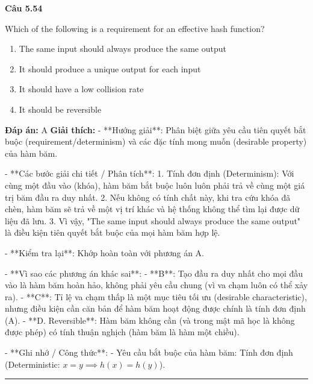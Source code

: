 \documentclass[11pt,a4paper]{article}
\newenvironment{question}[1]{%
  \par\vspace{1em}\noindent\textbf{\large Câu #1}\par\vspace{0.4em}
}{%
  \par\vspace{1em}\hrule\vspace{0.6em}
}
\newenvironment{choices}{%
  \begin{enumerate}[label=\textbf{\Alph*.},leftmargin=2.2em,itemsep=2pt,topsep=3pt]
}{%
  \end{enumerate}
}
\newcommand{\choice}{\item}
\begin{document}
\begin{question}{5.54}
Which of the following is a requirement for an effective hash function?
\begin{choices}
\choice The same input should always produce the same output
\choice It should produce a unique output for each input
\choice It should have a low collision rate
\choice It should be reversible
\end{choices}
\textbf{Đáp án:} A
\textbf{Giải thích:} - **Hướng giải**:
  Phân biệt giữa yêu cầu tiên quyết bắt buộc (requirement/determinism) và các đặc tính mong muốn (desirable property) của hàm băm.

- **Các bước giải chi tiết / Phân tích**:
  1. Tính đơn định (Determinism): Với cùng một đầu vào (khóa), hàm băm bắt buộc luôn luôn phải trả về cùng một giá trị băm đầu ra duy nhất.
  2. Nếu không có tính chất này, khi tra cứu khóa đã chèn, hàm băm sẽ trả về một vị trí khác và hệ thống không thể tìm lại được dữ liệu đã lưu.
  3. Vì vậy, "The same input should always produce the same output" là điều kiện tiên quyết bắt buộc của mọi hàm băm hợp lệ.

- **Kiểm tra lại**:
  Khớp hoàn toàn với phương án A.

- **Vì sao các phương án khác sai**:
  - **B**: Tạo đầu ra duy nhất cho mọi đầu vào là hàm băm hoàn hảo, không phải yêu cầu chung (vì va chạm luôn có thể xảy ra).
  - **C**: Tỉ lệ va chạm thấp là một mục tiêu tối ưu (desirable characteristic), nhưng điều kiện cần căn bản để hàm băm hoạt động được chính là tính đơn định (A).
  - **D. Reversible**: Hàm băm không cần (và trong mật mã học là không được phép) có tính thuận nghịch (hàm băm là hàm một chiều).

- **Ghi nhớ / Công thức**:
  - Yêu cầu bắt buộc của hàm băm: Tính đơn định (Deterministic: \(x = y \implies h(x) = h(y)\)).
\end{question}
\end{document}
